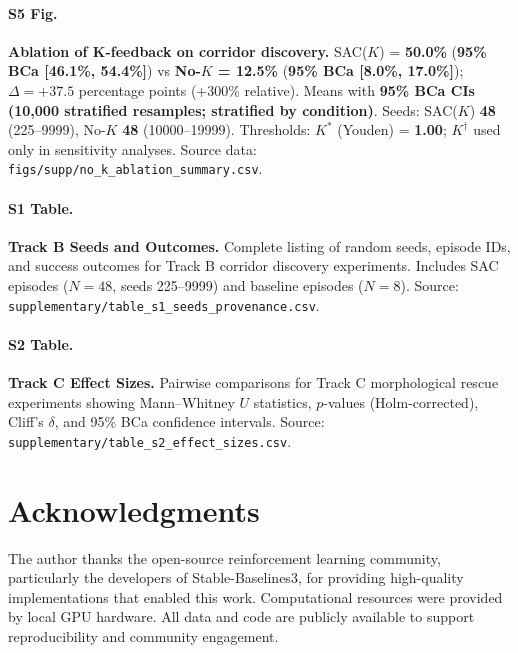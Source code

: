 \documentclass[10pt,letterpaper]{article}
\begin{document}
\paragraph*{S5 Fig.}
\label{S5_Fig}
\textbf{Ablation of K-feedback on corridor discovery.}
SAC($K$) = \textbf{50.0\%} (\textbf{95\% BCa [46.1\%, 54.4\%]}) vs \textbf{No-$K$ = 12.5\%} (\textbf{95\% BCa [8.0\%, 17.0\%]}); $\Delta = +37.5$ percentage points (+300\% relative). Means with \textbf{95\% BCa CIs (10,000 stratified resamples; stratified by condition)}. Seeds: SAC($K$) \textbf{48} (225–9999), No-$K$ \textbf{48} (10000–19999). Thresholds: $K^*$ (Youden) = \textbf{1.00}; $K^\dagger$ used only in sensitivity analyses. Source data: \texttt{figs/supp/no\_k\_ablation\_summary.csv}.

\paragraph*{S1 Table.}
\label{S1_Table}
\textbf{Track B Seeds and Outcomes.}
Complete listing of random seeds, episode IDs, and success outcomes for Track B corridor discovery experiments. Includes SAC episodes ($N = 48$, seeds 225–9999) and baseline episodes ($N = 8$). Source: \texttt{supplementary/table\_s1\_seeds\_provenance.csv}.

\paragraph*{S2 Table.}
\label{S2_Table}
\textbf{Track C Effect Sizes.}
Pairwise comparisons for Track C morphological rescue experiments showing Mann–Whitney $U$ statistics, $p$-values (Holm-corrected), Cliff's $\delta$, and 95\% BCa confidence intervals. Source: \texttt{supplementary/table\_s2\_effect\_sizes.csv}.

\section*{Acknowledgments}

The author thanks the open-source reinforcement learning community, particularly the developers of Stable-Baselines3, for providing high-quality implementations that enabled this work. Computational resources were provided by local GPU hardware. All data and code are publicly available to support reproducibility and community engagement.

\nolinenumbers
\end{document}
